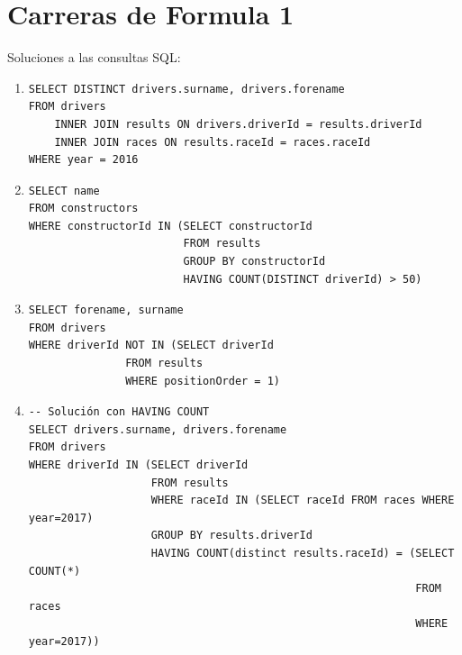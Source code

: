 \documentclass[a4paper]{article}
\begin{document}
\section*{Carreras de Formula 1}

Soluciones a las consultas SQL:

\begin{enumerate}
    \item %
    \begin{verbatim}  
SELECT DISTINCT drivers.surname, drivers.forename
FROM drivers 
	INNER JOIN results ON drivers.driverId = results.driverId
	INNER JOIN races ON results.raceId = races.raceId
WHERE year = 2016
    \end{verbatim}
    
    \item %
    \begin{verbatim}  
SELECT name
FROM constructors
WHERE constructorId IN (SELECT constructorId
                        FROM results
                        GROUP BY constructorId
                        HAVING COUNT(DISTINCT driverId) > 50)
    \end{verbatim}
    
    \item %
    \begin{verbatim}  
SELECT forename, surname
FROM drivers
WHERE driverId NOT IN (SELECT driverId
               FROM results
               WHERE positionOrder = 1)
    \end{verbatim}            
    
    \item %
    \begin{verbatim}  
-- Solución con HAVING COUNT
SELECT drivers.surname, drivers.forename
FROM drivers
WHERE driverId IN (SELECT driverId
                   FROM results
                   WHERE raceId IN (SELECT raceId FROM races WHERE year=2017)
                   GROUP BY results.driverId
                   HAVING COUNT(distinct results.raceId) = (SELECT COUNT(*)
                                                            FROM races
                                                            WHERE year=2017))
                                

\end{verbatim}
\end{enumerate}
\end{document}
